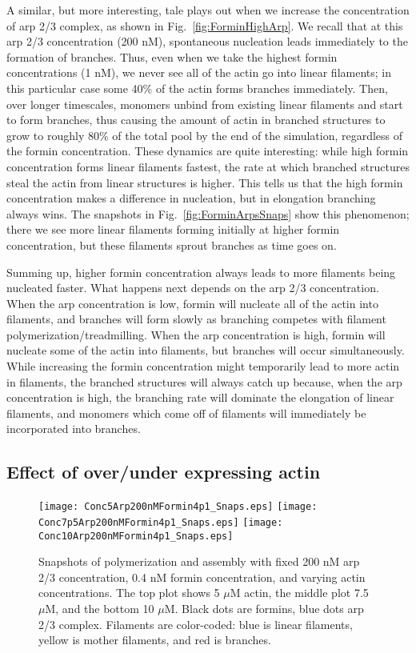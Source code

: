 \documentclass[11pt]{article}
\begin{document}
A similar, but more interesting, tale plays out when we increase the concentration of arp 2/3 complex, as shown in Fig.\ \ref{fig:ForminHighArp}. We recall that at this arp 2/3 concentration (200 nM), spontaneous nucleation leads immediately to the formation of branches. Thus, even when we take the highest formin concentrations (1 nM), we never see all of the actin go into linear filaments; in this particular case some 40\% of the actin forms branches immediately. Then, over longer timescales, monomers unbind from existing linear filaments and start to form branches, thus causing the amount of actin in branched structures to grow to roughly 80\% of the total pool by the end of the simulation, regardless of the formin concentration. These dynamics are quite interesting: while high formin concentration forms linear filaments fastest, the rate at which branched structures steal the actin from linear structures is higher. This tells us that the high formin concentration makes a difference in nucleation, but in elongation branching always wins. The snapshots in Fig.\ \ref{fig:ForminArpsSnaps} show this phenomenon; there we see more linear filaments forming initially at higher formin concentration, but these filaments sprout branches as time goes on.

Summing up, higher formin concentration always leads to more filaments being nucleated faster. What happens next depends on the arp 2/3 concentration. When the arp concentration is low, formin will nucleate all of the actin into filaments, and branches will form slowly as branching competes with filament polymerization/treadmilling. When the arp concentration is high, formin will nucleate some of the actin into filaments, but branches will occur simultaneously. While increasing the formin concentration might temporarily lead to more actin in filaments, the branched structures will always catch up because, when the arp concentration is high, the branching rate will dominate the elongation of linear filaments, and monomers which come off of filaments will immediately be incorporated into branches. 

\subsection{Effect of over/under expressing actin}
\begin{figure}
\centering
\texttt{[image: Conc5Arp200nMFormin4p1\_Snaps.eps]}
\texttt{[image: Conc7p5Arp200nMFormin4p1\_Snaps.eps]}
\texttt{[image: Conc10Arp200nMFormin4p1\_Snaps.eps]}
\caption{\label{fig:ForminConcSnaps}Snapshots of polymerization and assembly with fixed 200 nM arp 2/3 concentration, 0.4 nM formin concentration, and varying actin concentrations. The top plot shows 5 $\mu$M actin, the middle plot 7.5 $\mu$M, and the bottom 10 $\mu$M. Black dots are formins, blue dots arp 2/3 complex. Filaments are color-coded: blue is linear filaments, yellow is mother filaments, and red is branches.}
\end{figure}
\end{document}
